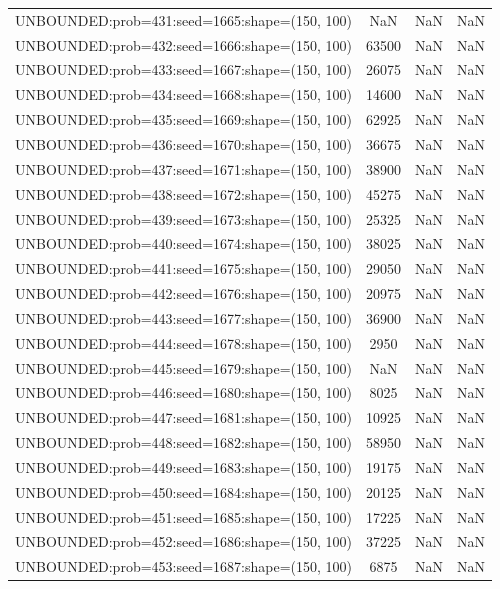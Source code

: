 \begin{longtable}{lccc}
UNBOUNDED:prob=431:seed=1665:shape=(150, 100) &   NaN &   NaN &    NaN \\
UNBOUNDED:prob=432:seed=1666:shape=(150, 100) & 63500 &   NaN &    NaN \\
UNBOUNDED:prob=433:seed=1667:shape=(150, 100) & 26075 &   NaN &    NaN \\
UNBOUNDED:prob=434:seed=1668:shape=(150, 100) & 14600 &   NaN &    NaN \\
UNBOUNDED:prob=435:seed=1669:shape=(150, 100) & 62925 &   NaN &    NaN \\
UNBOUNDED:prob=436:seed=1670:shape=(150, 100) & 36675 &   NaN &    NaN \\
UNBOUNDED:prob=437:seed=1671:shape=(150, 100) & 38900 &   NaN &    NaN \\
UNBOUNDED:prob=438:seed=1672:shape=(150, 100) & 45275 &   NaN &    NaN \\
UNBOUNDED:prob=439:seed=1673:shape=(150, 100) & 25325 &   NaN &    NaN \\
UNBOUNDED:prob=440:seed=1674:shape=(150, 100) & 38025 &   NaN &    NaN \\
UNBOUNDED:prob=441:seed=1675:shape=(150, 100) & 29050 &   NaN &    NaN \\
UNBOUNDED:prob=442:seed=1676:shape=(150, 100) & 20975 &   NaN &    NaN \\
UNBOUNDED:prob=443:seed=1677:shape=(150, 100) & 36900 &   NaN &    NaN \\
UNBOUNDED:prob=444:seed=1678:shape=(150, 100) &  2950 &   NaN &    NaN \\
UNBOUNDED:prob=445:seed=1679:shape=(150, 100) &   NaN &   NaN &    NaN \\
UNBOUNDED:prob=446:seed=1680:shape=(150, 100) &  8025 &   NaN &    NaN \\
UNBOUNDED:prob=447:seed=1681:shape=(150, 100) & 10925 &   NaN &    NaN \\
UNBOUNDED:prob=448:seed=1682:shape=(150, 100) & 58950 &   NaN &    NaN \\
UNBOUNDED:prob=449:seed=1683:shape=(150, 100) & 19175 &   NaN &    NaN \\
UNBOUNDED:prob=450:seed=1684:shape=(150, 100) & 20125 &   NaN &    NaN \\
UNBOUNDED:prob=451:seed=1685:shape=(150, 100) & 17225 &   NaN &    NaN \\
UNBOUNDED:prob=452:seed=1686:shape=(150, 100) & 37225 &   NaN &    NaN \\
UNBOUNDED:prob=453:seed=1687:shape=(150, 100) &  6875 &   NaN &    NaN \\

\end{longtable}
